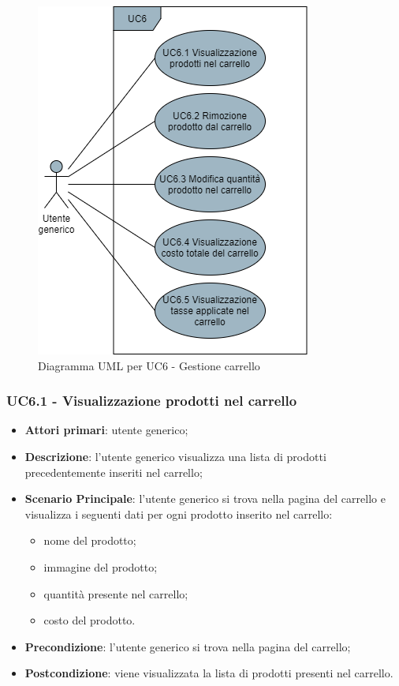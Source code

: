 \begin{figure}[H]
\centering
\includegraphics[scale=0.6]{res/UseCase/Immagini/GestioneCarrello}
\caption{Diagramma UML per UC6 - Gestione carrello}
\end{figure}

\subsubsection{UC6.1 - Visualizzazione prodotti nel carrello}
\begin{itemize}
\item \textbf{Attori primari}: utente generico;
\item \textbf{Descrizione}: l'utente generico visualizza una lista di prodotti precedentemente inseriti nel carrello;
\item \textbf{Scenario Principale}: l'utente generico si trova nella pagina del carrello e visualizza i seguenti dati per ogni prodotto inserito nel carrello:
\begin{itemize}
\item nome del prodotto;
\item immagine del prodotto;
\item quantità presente nel carrello;
\item costo del prodotto.
\end{itemize}
\item \textbf{Precondizione}: l'utente generico si trova nella pagina del carrello;
\item \textbf{Postcondizione}: viene visualizzata la lista di prodotti presenti nel carrello.
\end{itemize}

